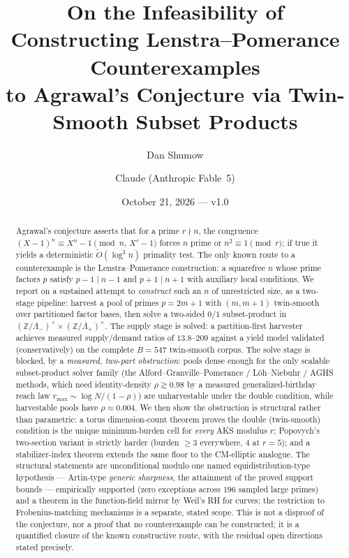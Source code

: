\documentclass[11pt]{article}
\title{On the Infeasibility of Constructing Lenstra--Pomerance
Counterexamples\\ to Agrawal's Conjecture via Twin-Smooth Subset Products}
\author{Dan Shumow \and Claude (Anthropic Fable~5)}
\date{October 21, 2026 --- v1.0}
\theoremstyle{remark}
\newcommand{\Z}{\mathbb{Z}}
\begin{document}
\maketitle

\begin{abstract}
Agrawal's conjecture asserts that for a prime $r \nmid n$, the congruence
$(X-1)^n \equiv X^n - 1 \pmod{n,\,X^r-1}$ forces $n$ prime or
$n^2 \equiv 1 \pmod r$; if true it yields a deterministic
$\tilde O(\log^3 n)$ primality test. The only known route to a
counterexample is the Lenstra--Pomerance construction: a squarefree $n$
whose prime factors $p$ satisfy $p - 1 \mid n - 1$ and $p + 1 \mid n + 1$
with auxiliary local conditions. We report on a sustained attempt to
\emph{construct} such an $n$ of unrestricted size, as a two-stage pipeline:
harvest a pool of primes $p = 2m+1$ with $(m, m+1)$ twin-smooth over
partitioned factor bases, then solve a two-sided $0/1$ subset-product in
$(\Z/\Lambda_-)^\times \times (\Z/\Lambda_+)^\times$. The supply stage is
solved: a partition-first harvester achieves measured supply/demand ratios
of $13.8$--$209$ against a yield model validated (conservatively) on the
complete $B = 547$ twin-smooth corpus. The solve stage is blocked, by a
\emph{measured, two-part obstruction}: pools dense enough for the only
scalable subset-product solver family (the Alford--Granville--Pomerance /
L\"oh--Niebuhr / AGHS methods, which need identity-density
$\rho \gtrsim 0.98$ by a measured generalized-birthday reach law
$r_{\max} \sim \log N / (1 - \rho)$) are unharvestable under the double
condition, while harvestable pools have $\rho \approx 0.004$. We then show
the obstruction is structural rather than parametric: a torus
dimension-count theorem proves the double (twin-smooth) condition is the
unique minimum-burden cell for \emph{every} AKS modulus $r$; Popovych's
two-section variant is strictly harder (burden $\ge 3$ everywhere, $4$ at
$r = 5$); and a stabilizer-index theorem extends the same floor to the
CM-elliptic analogue. The structural statements are unconditional modulo
one named equidistribution-type hypothesis --- Artin-type \emph{generic
sharpness}, the attainment of the proved support bounds --- empirically
supported (zero exceptions across $196$ sampled large primes) and a
theorem in the function-field mirror by Weil's RH for curves; the
restriction to Frobenius-matching mechanisms is a separate, stated scope.
This is not a disproof of the conjecture, nor a proof
that no counterexample can be constructed; it is a quantified closure of
the known constructive route, with the residual open directions stated
precisely.
\end{abstract}
\end{document}
